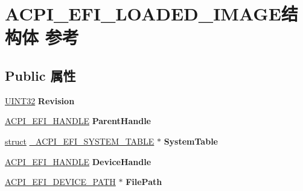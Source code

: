 \hypertarget{struct_a_c_p_i___e_f_i___l_o_a_d_e_d___i_m_a_g_e}{}\section{A\+C\+P\+I\+\_\+\+E\+F\+I\+\_\+\+L\+O\+A\+D\+E\+D\+\_\+\+I\+M\+A\+G\+E结构体 参考}
\label{struct_a_c_p_i___e_f_i___l_o_a_d_e_d___i_m_a_g_e}
\subsection*{Public 属性}
\begin{DoxyCompactItemize}
\item 
\mbox{\label{struct_a_c_p_i___e_f_i___l_o_a_d_e_d___i_m_a_g_e_ad12abd22093ebad347c8b50ecad2baa6}} 
\hyperlink{_processor_bind_8h_ae1e6edbbc26d6fbc71a90190d0266018}{U\+I\+N\+T32} {\bfseries Revision}
\item 
\mbox{\label{struct_a_c_p_i___e_f_i___l_o_a_d_e_d___i_m_a_g_e_a5e1a5a2e14cab14d48d912b7d4e0f934}} 
\hyperlink{interfacevoid}{A\+C\+P\+I\+\_\+\+E\+F\+I\+\_\+\+H\+A\+N\+D\+LE} {\bfseries Parent\+Handle}
\item 
\mbox{\label{struct_a_c_p_i___e_f_i___l_o_a_d_e_d___i_m_a_g_e_affd2586cae0c271a7c000ec8f4beffe9}} 
\hyperlink{interfacestruct}{struct} \hyperlink{struct___a_c_p_i___e_f_i___s_y_s_t_e_m___t_a_b_l_e}{\+\_\+\+A\+C\+P\+I\+\_\+\+E\+F\+I\+\_\+\+S\+Y\+S\+T\+E\+M\+\_\+\+T\+A\+B\+LE} $\ast$ {\bfseries System\+Table}
\item 
\mbox{\label{struct_a_c_p_i___e_f_i___l_o_a_d_e_d___i_m_a_g_e_a0ab0d7cc1684f36158b30976d1ba19e1}} 
\hyperlink{interfacevoid}{A\+C\+P\+I\+\_\+\+E\+F\+I\+\_\+\+H\+A\+N\+D\+LE} {\bfseries Device\+Handle}
\item 
\mbox{\label{struct_a_c_p_i___e_f_i___l_o_a_d_e_d___i_m_a_g_e_a45668b695cc0d2f481c972a1d492b98d}} 
\hyperlink{struct___a_c_p_i___e_f_i___d_e_v_i_c_e___p_a_t_h}{A\+C\+P\+I\+\_\+\+E\+F\+I\+\_\+\+D\+E\+V\+I\+C\+E\+\_\+\+P\+A\+TH} $\ast$ {\bfseries File\+Path}

\end{DoxyCompactItemize}
